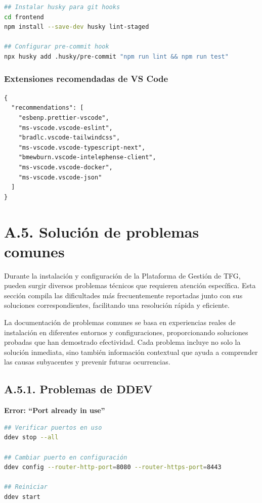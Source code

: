 \documentclass[12pt,a4paper,oneside]{report}
\begin{document}
\begin{lstlisting}[language=bash]
## Instalar husky para git hooks
cd frontend
npm install --save-dev husky lint-staged

## Configurar pre-commit hook
npx husky add .husky/pre-commit "npm run lint && npm run test"
\end{lstlisting}

\subsubsection{Extensiones recomendadas de VS
Code}\label{extensiones-recomendadas-de-vs-code}

\begin{lstlisting}
{
  "recommendations": [
    "esbenp.prettier-vscode",
    "ms-vscode.vscode-eslint",
    "bradlc.vscode-tailwindcss",
    "ms-vscode.vscode-typescript-next",
    "bmewburn.vscode-intelephense-client",
    "ms-vscode.vscode-docker",
    "ms-vscode.vscode-json"
  ]
}
\end{lstlisting}

\section{A.5. Solución de problemas
comunes}\label{a.5.-soluciuxf3n-de-problemas-comunes}

Durante la instalación y configuración de la Plataforma de Gestión de TFG, pueden surgir diversos problemas técnicos que requieren atención específica. Esta sección compila las dificultades más frecuentemente reportadas junto con sus soluciones correspondientes, facilitando una resolución rápida y eficiente.

La documentación de problemas comunes se basa en experiencias reales de instalación en diferentes entornos y configuraciones, proporcionando soluciones probadas que han demostrado efectividad. Cada problema incluye no solo la solución inmediata, sino también información contextual que ayuda a comprender las causas subyacentes y prevenir futuras ocurrencias.

\subsection{A.5.1. Problemas de DDEV}\label{a.5.1.-problemas-de-ddev}

\textbf{Error: ``Port already in use''}

\begin{lstlisting}[language=bash]
## Verificar puertos en uso
ddev stop --all

## Cambiar puerto en configuración
ddev config --router-http-port=8080 --router-https-port=8443

## Reiniciar
ddev start
\end{lstlisting}
\end{document}
